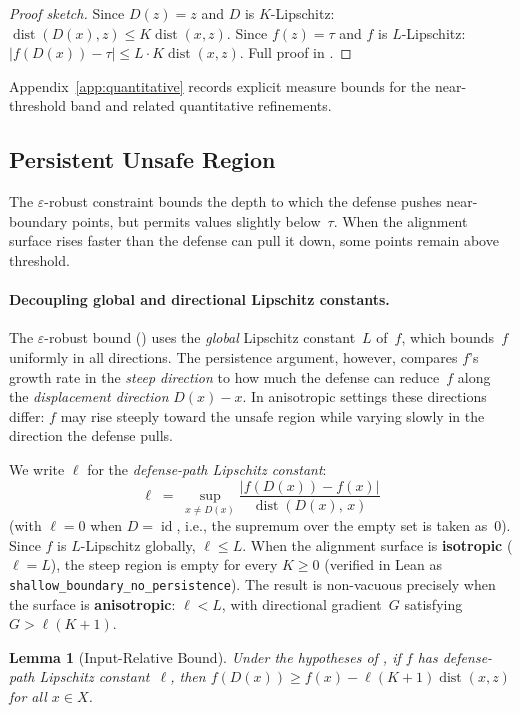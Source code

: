 \documentclass[11pt]{article}
\newtheorem{lemma}[theorem]{Lemma}
\newcommand{\id}{\operatorname{id}}
\newcommand{\dist}{\operatorname{dist}}
\begin{document}
\begin{proof}[Proof sketch]
Since $D(z)=z$ and $D$ is $K$-Lipschitz:
$\dist(D(x),z) \leq K\dist(x,z)$. Since $f(z)=\tau$ and $f$ is
$L$-Lipschitz:
$|f(D(x)) - \tau| \leq L \cdot K\dist(x,z)$.
Full proof in .
\end{proof}

Appendix~\ref{app:quantitative} records explicit measure bounds for the
near-threshold band and related quantitative refinements.

\subsection{Persistent Unsafe Region}
\label{sec:persistent}

The $\varepsilon$-robust constraint bounds the depth to which the
defense pushes near-boundary points, but permits values slightly
below~$\tau$. When the alignment surface rises faster than the
defense can pull it down, some points remain above threshold.

\paragraph{Decoupling global and directional Lipschitz constants.}
The $\varepsilon$-robust bound () uses the
\emph{global} Lipschitz constant~$L$ of~$f$, which bounds~$f$
uniformly in all directions. The persistence argument, however,
compares $f$'s growth rate in the \emph{steep direction} to how much
the defense can reduce~$f$ along the \emph{displacement direction}
$D(x) - x$. In anisotropic settings these directions differ: $f$ may
rise steeply toward the unsafe region while varying slowly in the
direction the defense pulls.

We write $\ell$ for the \emph{defense-path Lipschitz constant}:
\[
  \ell \;=\; \sup_{x \neq D(x)}
    \frac{|f(D(x)) - f(x)|}{\dist(D(x),\, x)}
\]
(with $\ell = 0$ when $D = \id$, i.e., the supremum over the empty
set is taken as~$0$).
Since $f$ is $L$-Lipschitz globally, $\ell \leq L$. When the
alignment surface is \textbf{isotropic} ($\ell = L$), the steep region
is empty for every $K \geq 0$ (verified in Lean as
\texttt{shallow\_boundary\_no\_persistence}). The result is
non-vacuous precisely when the surface is \textbf{anisotropic}:
$\ell < L$, with directional gradient~$G$ satisfying
$G > \ell(K+1)$.

\begin{lemma}[Input-Relative Bound]
\label{lem:input-bound}
Under the hypotheses of , if $f$ has
defense-path Lipschitz constant~$\ell$, then
$f(D(x)) \geq f(x) - \ell(K+1)\dist(x,z)$
for all $x \in X$.
\end{lemma}
\end{document}
